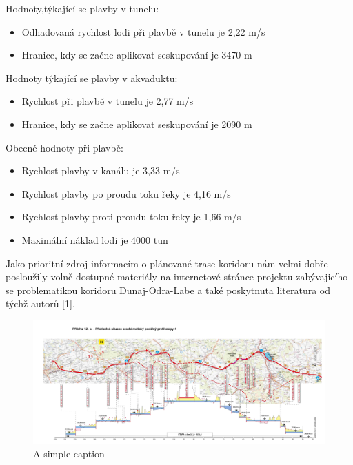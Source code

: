 \documentclass[11pt,a4paper]{article}
\begin{document}
    \noindent
    Hodnoty,týkající se plavby v tunelu:

    \begin{itemize}
      \item Odhadovaná rychlost lodi při plavbě v tunelu je 2,22 m/s

      \item Hranice, kdy se začne aplikovat seskupování je 3470 m
    \end{itemize}

    \noindent
    Hodnoty týkající se plavby v akvaduktu:

    \begin{itemize}
      \item Rychlost při plavbě v tunelu je 2,77 m/s
      \item Hranice, kdy se začne aplikovat seskupování je 2090 m
    \end{itemize}

    \noindent
    Obecné hodnoty při plavbě:

    \begin{itemize}
      \item Rychlost plavby v kanálu je 3,33 m/s
      \item Rychlost plavby po proudu toku řeky je 4,16 m/s
      \item Rychlost plavby proti proudu toku řeky je 1,66 m/s
      \item Maximální náklad lodi je 4000 tun
    \end{itemize}
        
    Jako prioritní zdroj informacím o plánované trase koridoru 
    nám velmi dobře posloužily volně
    dostupné materiály na internetové stránce projektu zabývajicího se
    problematikou koridoru Dunaj-Odra-Labe a také poskytnuta literatura od
    týchž autorů [1].

    \begin{figure}[ht!]
      \centering
      \includegraphics[width=1\textwidth, natwidth=6969, natheight=2953]
                      {etapa4.jpg}
      \caption{A simple caption \label{overflow}}
    \end{figure}
\end{document}
